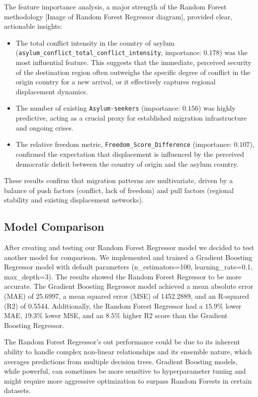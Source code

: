 \documentclass{article}
\theoremstyle{plain}
\theoremstyle{definition}
\theoremstyle{remark}
\begin{document}
The feature importance analysis, a major strength of the Random Forest methodology [Image of Random Forest Regressor diagram], provided clear, actionable insights:
\begin{itemize}
    \item The total conflict intensity in the country of asylum (\texttt{asylum\_conflict\_total\_conflict\_intensity}, importance: $0.178$) was the most influential feature. This suggests that the immediate, perceived security of the destination region often outweighs the specific degree of conflict in the origin country for a new arrival, or it effectively captures regional displacement dynamics.
    \item The number of existing \texttt{Asylum-seekers} (importance: $0.156$) was highly predictive, acting as a crucial proxy for established migration infrastructure and ongoing crises.
    \item The relative freedom metric, \texttt{Freedom\_Score\_Difference} (importance: $0.107$), confirmed the expectation that displacement is influenced by the perceived democratic deficit between the country of origin and the asylum country.
\end{itemize}
These results confirm that migration patterns are multivariate, driven by a balance of push factors (conflict, lack of freedom) and pull factors (regional stability and existing displacement networks).

\subsection{Model Comparison}
After creating and testing our Random Forest Regressor model we decided to test another model for comparison. We implemented and trained a Gradient Boosting Regressor model with default parameters (n\_estimators=100, learning\_rate=0.1, max\_depth=3). The results showed the Random Forest Regressor to be more accurate. The Gradient Boosting Regressor model achieved a mean absolute error (MAE) of 25.6997, a mean squared error (MSE) of 1452.2889, and an R-squared (R2) of 0.5544. Additionally, the Random Forest Regressor had a  $15.9\%$ lower MAE, $19.3\%$ lower MSE, and an $8.5\%$ higher R2 score than the Gradient Boosting Regressor.

The Random Forest Regressor's out performance could be due to its inherent ability to handle complex non-linear relationships and its ensemble nature, which averages predictions from multiple decision trees. Gradient Boosting models, while powerful, can sometimes be more sensitive to hyperparameter tuning and might require more aggressive optimization to surpass Random Forests in certain datasets.
\end{document}
